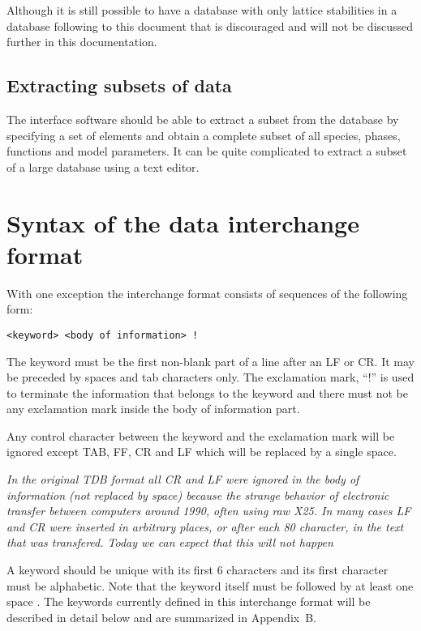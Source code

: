 \documentclass[12pt]{article}
\begin{document}
Although it is still possible to have a database with only lattice
stabilities in a database following to this document that is
discouraged and will not be discussed further in this documentation.

\subsection{Extracting subsets of data}

The interface software should be able to extract a subset from the
database by specifying a set of elements and obtain a complete subset
of all species, phases, functions and model parameters.  It can be
quite complicated to extract a subset of a large database using a text
editor.

\section{Syntax of the data interchange format}\label{sec:keyword}

With one exception the interchange format consists of sequences of the
following form:

\begin{verbatim}
<keyword> <body of information> !
\end{verbatim}

The keyword must be the first non-blank part of a line after an LF or
CR.  It may be preceded by spaces and tab characters only.  The
exclamation mark, ``!''  is used to terminate the information that
belongs to the keyword and there must not be any exclamation mark
inside the body of information part.

Any control character between the keyword and the exclamation mark
will be ignored except TAB, FF, CR and LF which will be replaced by a
single space.

{\em In the original TDB format all CR and LF were ignored in the body
  of information (not replaced by space) because the strange behavior
  of electronic transfer between computers around 1990, often using
  raw X25.  In many cases LF and CR were inserted in arbitrary places,
  or after each 80 character, in the text that was transfered.  Today
  we can expect that this will not happen}

A keyword should be unique with its first 6 characters and its first
character must be alphabetic.  Note that the keyword itself must be
followed by at least one space .  The keywords currently defined in
this interchange format will be described in detail below and are
summarized in Appendix~B.
\end{document}
